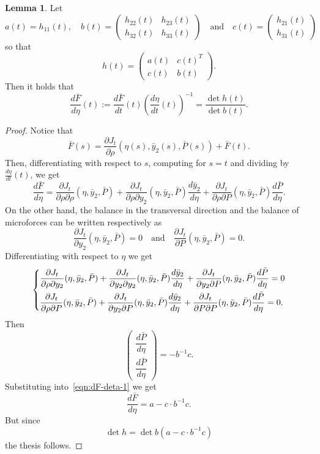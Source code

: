 \documentclass[a4paper,10pt,twoside]{amsbook}
\numberwithin{section}{chapter}
\numberwithin{equation}{chapter}
\theoremstyle{definition}
\newtheorem{lemma}[prop]{Lemma}
\newcommand{\dind}[2]{\frac{\partial #1}{\partial #2}}
\begin{document}
\begin{lemma}
\label{lemma:stability-force}
Let
\[
a(t)=h_{11}(t),\quad
b(t)=\begin{pmatrix}
h_{22}(t) & h_{23}(t) \\
h_{32}(t) & h_{33}(t)
\end{pmatrix}\quad\text{and}\quad
c(t)=\begin{pmatrix}
h_{21}(t) \\
h_{31}(t)
\end{pmatrix}
\]
so that
\[
h(t)=\begin{pmatrix}
a(t) & c(t)^T \\
c(t) & b(t)
\end{pmatrix}.
\]
Then it holds that
\[
\frac{d\bar F}{d\eta}(t):=\frac{d\bar F}{dt}(t)\left(\frac{d\eta}{dt}(t)\right)^{-1}=\frac{\det h(t)}{\det b(t)}.
\]
\end{lemma}
\begin{proof}
Notice that
\[
\bar F(s)=\dind{J_t}{\rho}(\eta(s),\bar y_2(s),\bar P(s))+\bar{F}(t).
\]
Then, differentiating with respect to $s$, computing for $s=t$ and dividing by $\frac{d\eta}{dt}(t)$, we get
\begin{equation}
\label{eqn:dF-deta-1}
\frac{d\bar F}{d\eta}=\dind{J_t}{\rho\partial\rho}(\eta,\bar y_2,\bar P)+\dind{J_t}{\rho\partial y_2}(\eta,\bar y_2,\bar P)\frac{d\bar y_2}{d\eta}+\dind{J_t}{\rho\partial P}(\eta,\bar y_2,\bar P)\frac{d\bar P}{d\eta}.
\end{equation}
On the other hand, the balance in the transversal direction and the balance of microforces can be written respectively as
\[
\dind{J_t}{y_2}(\eta,\bar y_2,\bar P)=0\quad\text{and}\quad\dind{J_t}{P}(\eta,\bar y_2,\bar P)=0.
\]
Differentiating with respect to $\eta$ we get
\[
\begin{dcases}
\dind{J_t}{\rho\partial y_2}(\eta,\bar y_2,\bar P)+\dind{J_t}{y_2\partial y_2}(\eta,\bar y_2,\bar P)\frac{d\bar y_2}{d\eta}+\dind{J_t}{y_2\partial P}(\eta,\bar y_2,\bar P)\frac{d\bar P}{d\eta}=0 \\
\dind{J_t}{\rho\partial P}(\eta,\bar y_2,\bar P)+\dind{J_t}{y_2\partial P}(\eta,\bar y_2,\bar P)\frac{d\bar y_2}{d\eta}+\dind{J_t}{P\partial P}(\eta,\bar y_2,\bar P)\frac{d\bar P}{d\eta}=0.
\end{dcases}
\]
Then
\[
\begin{pmatrix}
\dfrac{d\bar P}{d\eta} \\
\dfrac{d\bar P}{d\eta}
\end{pmatrix}=
-b^{-1} c.
\]
Substituting into~\eqref{eqn:dF-deta-1} we get
\[
\frac{d\bar F}{d\eta}=a-c\cdot b^{-1}c.
\]
But since
\[
\det h=\det b\left(a-c\cdot b^{-1}c\right)
\]
the thesis follows.
\end{proof}
\end{document}
